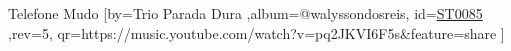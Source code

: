 \beginsong
{Telefone Mudo %
}[by={Trio Parada Dura %
},album={@walyssondosreis},
id={\href{https://music.youtube.com/watch?v=pq2JKVI6F5s&feature=share %
}{ST0085 %
}},rev={5}, %
qr={https://music.youtube.com/watch?v=pq2JKVI6F5s&feature=share %
}]
\beginverse
